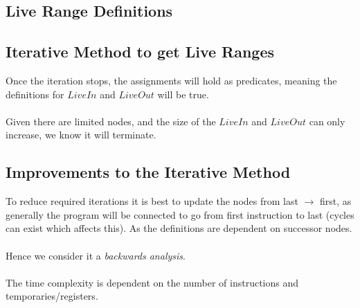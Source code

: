 \documentclass{report}
\begin{document}
\subsection*{Live Range Definitions}

\subsection*{Iterative Method to get Live Ranges}
Once the iteration stops, the assignments will hold as predicates, meaning the definitions for $LiveIn$ and $LiveOut$ will be true.
\\
\\ Given there are limited nodes, and the size of the $LiveIn$ and $LiveOut$ can only increase, we know it will terminate.

\subsection*{Improvements to the Iterative Method}
To reduce required iterations it is best to update the nodes from last $\to$ first, as generally the program will be connected to go from first instruction to last (cycles can exist which affects this). As the definitions are dependent on successor nodes.
\\
\\ Hence we consider it a \textit{backwards analysis}.
\\
\\ The time complexity is dependent on the number of instructions and temporaries/registers.
\end{document}
